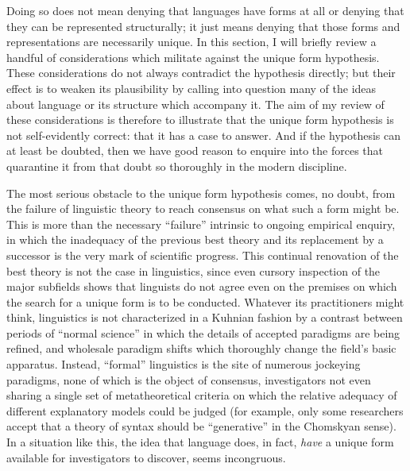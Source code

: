 \documentclass[output=paper]{langscibook}
\begin{document}
Doing so does not mean denying that languages have forms at all or denying that they can be represented structurally; it just means denying that those forms and representations are necessarily unique. In this section, I will briefly review a handful of considerations which militate against the unique form hypothesis. These considerations do not always contradict the hypothesis directly; but their effect is to weaken its plausibility by calling into question many of the ideas about language or its structure which accompany it. The aim of my review of these considerations is therefore to illustrate that the unique form hypothesis is not self-evidently correct: that it has a case to answer. And if the hypothesis can at least be doubted, then we have good reason to enquire into the forces that quarantine it from that doubt so thoroughly in the modern discipline.

The most serious obstacle to the unique form hypothesis comes, no doubt, from the failure of linguistic theory to reach consensus on what such a form might be. This is more than the necessary ``failure'' intrinsic to ongoing empirical enquiry, in which the inadequacy of the previous best theory and its replacement by a successor is the very mark of scientific progress. This continual renovation of the best theory is not the case in linguistics, since even cursory inspection of the major subfields shows that linguists do not agree even on the premises on which the search for a unique form is to be conducted. Whatever its practitioners might think, linguistics is not characterized in a Kuhnian fashion by a contrast between periods of ``normal science'' in which the details of accepted paradigms are being refined, and wholesale paradigm shifts which thoroughly change the field's basic apparatus. Instead, ``formal'' linguistics is the site of numerous jockeying paradigms, none of which is the object of consensus, investigators not even sharing a single set of metatheoretical criteria on which the relative adequacy of different explanatory models could be judged (for example, only some researchers accept that a theory of syntax should be ``generative'' in the Chomskyan sense). In a situation like this, the idea that language does, in fact, \emph{have} a unique form available for investigators to discover, seems incongruous.
\end{document}
